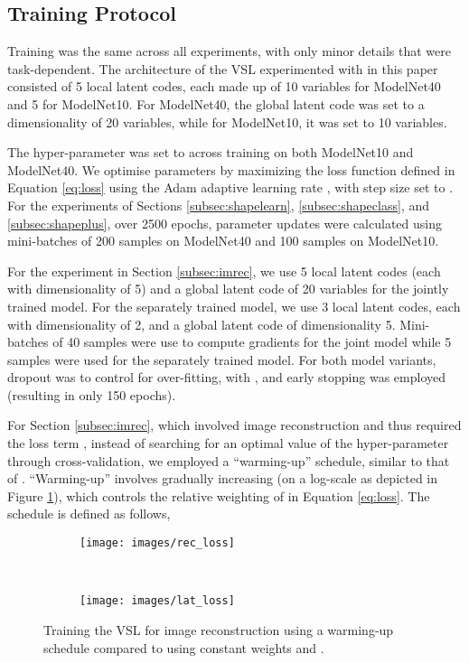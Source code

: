 \documentclass[10pt,twocolumn,letterpaper]{article}
\begin{document}
\subsection{Training Protocol}
\label{subsec:training}
Training was the same across all experiments, with only minor details that were task-dependent.
The architecture of the VSL experimented with in this paper consisted of 5 local latent codes, each made up of 10 variables for ModelNet40 and 5 for ModelNet10. For ModelNet40, the global latent code was set to a dimensionality of 20 variables, while for ModelNet10, it was set to 10 variables.

The hyper-parameter  was set to  across training on both ModelNet10 and ModelNet40. We optimise parameters by maximizing the loss function defined in Equation \ref{eq:loss} using the Adam adaptive learning rate \cite{kingma2014adam}, with step size set to . For the experiments of Sections \ref{subsec:shapelearn}, \ref{subsec:shapeclass}, and \ref{subsec:shapeplus}, over 2500 epochs, parameter updates were calculated using mini-batches of 200 samples on ModelNet40 and 100 samples on ModelNet10.

For the experiment in Section \ref{subsec:imrec}, we use 5 local latent codes (each with dimensionality of 5) and a global latent code of 20 variables for the jointly trained model. For the separately trained model, we use 3 local latent codes, each with dimensionality of 2, and a global latent code of dimensionality 5. Mini-batches of 40 samples were use to compute gradients for the joint model while 5 samples were used for the separately trained model. For both model variants, dropout \cite{srivastava2014dropout} was to control for over-fitting, with , and early stopping was employed (resulting in only 150 epochs).

For Section \ref{subsec:imrec}, which involved image reconstruction and thus required the loss term , instead of searching for an optimal value of the hyper-parameter  through cross-validation, we employed a ``warming-up'' schedule, similar to that of \cite{sonderby2016ladder}. ``Warming-up'' involves gradually increasing   (on a log-scale as depicted in Figure \ref{fig:losscompare}), which controls the relative weighting of  in Equation \ref{eq:loss}. The schedule is defined as follows,


\begin{figure}[ht!]
	\centering
  \begin{subfigure}[b]{0.23\textwidth}
    \centering
    \texttt{[image: images/rec\_loss]}
    \end{subfigure}
  \,
  \begin{subfigure}[b]{0.23\textwidth}
    \centering
    \texttt{[image: images/lat\_loss]}
  \end{subfigure}
	\caption{Training the VSL for image reconstruction using a warming-up schedule compared to using constant weights  and .}
  \label{fig:losscompare}
\end{figure}
\end{document}
